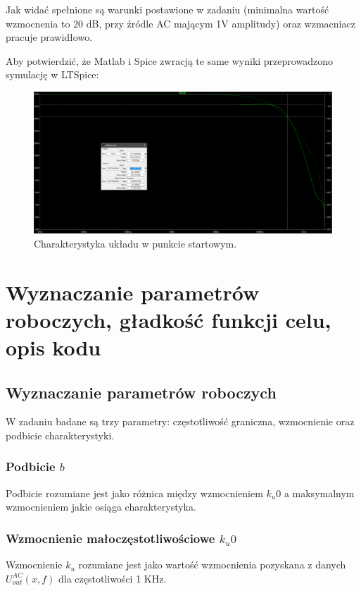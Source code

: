 \documentclass{article}
\begin{document}
Jak widać spełnione są warunki postawione w zadaniu (minimalna wartość wzmocnenia to 20 dB, przy źródle AC mającym 1V amplitudy) oraz wzmacniacz pracuje prawidłowo.
\pagebreak

Aby potwierdzić, że Matlab i Spice zwracją te same wyniki przeprowadzono symulację w LTSpice:
\begin{figure}[h]
	\includegraphics[width=12cm]{graphics/starting_point_spice.png}
	\centering
	\caption{Charakterystyka układu w punkcie startowym.}
\end{figure}


\section{Wyznaczanie parametrów roboczych, gładkość funkcji celu, opis kodu}
\subsection{Wyznaczanie parametrów roboczych}
W zadaniu badane są trzy parametry: częstotliwość graniczna, wzmocnienie oraz podbicie charakterystyki.

\subsubsection*{Podbicie $b$}
Podbicie rozumiane jest jako różnica między wzmocnieniem $k_u0$ a maksymalnym wzmocnieniem jakie osiąga charakterystyka.
\subsubsection*{Wzmocnienie małoczęstotliwościowe $k_u0$}
Wzmocnienie $k_u$ rozumiane jest jako wartość wzmocnienia pozyskana z danych $U^{AC}_{out}(x,f)$ dla częstotliwości 1 KHz.
\end{document}
